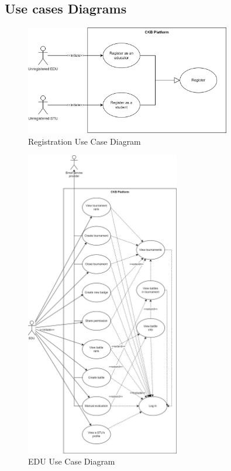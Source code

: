 \subsection{Use cases Diagrams}
\begin{figure}[H]
    \centering
    \includegraphics[width=0.8\textwidth]{images/sequence_diagrams/use_case_diagrams_registration.png}
    \caption{Registration Use Case Diagram}
\end{figure}

\begin{figure}[H]
    \centering
    \includegraphics[width=0.6\textwidth]{images/sequence_diagrams/use_case_diagrams_EDU.png}
    \caption{EDU Use Case Diagram}
\end{figure}

